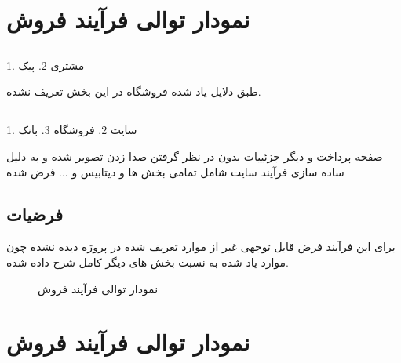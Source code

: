 \documentclass[12pt,onecolumn,a4paper]{article}
\begin{document}
\newpage
\tableofcontents
\newpage
\listoffigures
\newpage

\section{نمودار توالی فرآیند فروش}
\subsection{ }

1. مشتری
2. پیک

طبق دلایل یاد شده فروشگاه در این بخش تعریف نشده.
\subsection{ }
1. سایت
2. فروشگاه
3. بانک

صفحه پرداخت و دیگر جزئییات بدون در نظر گرفتن صدا زدن  تصویر شده و به دلیل ساده سازی فرآیند سایت شامل تمامی بخش ها و دیتابیس و ... فرض شده

\subsection{فرضیات }
برای این فرآیند فرض قابل توجهی غیر از موارد تعریف شده در پروژه دیده نشده چون موارد یاد شده به نسبت بخش های دیگر کامل شرح داده شده.

\newpage
\begin{figure}[!h]
\caption{نمودار توالی فرآیند فروش}\label{sellpng}
\end{figure}


\section{نمودار توالی فرآیند فروش}
\end{document}

